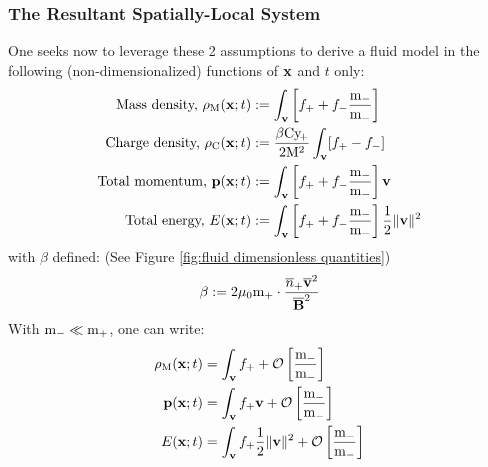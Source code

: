 \subsubsection*{The Resultant Spatially-Local System}
    One seeks now to leverage these 2 assumptions to derive a fluid model in the following (non-dimensionalized) functions of $\mathbf{x}$ and $t$ only:
    \begin{align}
        \text{Mass density, }   \rho_{\mathrm{M}}(\mathbf{x}; t)  &:=  \int_{\mathbf{v}}\left[f_{+} + f_{-}\frac{\mathrm{m}_{-}}{\mathrm{m}_{-}}\right]  \\
        \text{Charge density, } \rho_{\mathrm{C}}(\mathbf{x}; t)  &:=  \frac{\beta\mathrm{Cy}\!_{+}}{2\mathrm{M}^{2}}\int_{\mathbf{v}}[f_{+} - f_{-}]  \\
        \text{Total momentum, }        \mathbf{p}(\mathbf{x}; t)  &:=  \int_{\mathbf{v}}\left[f_{+} + f_{-}\frac{\mathrm{m}_{-}}{\mathrm{m}_{-}}\right]\mathbf{v}  \\
        \text{Total energy, }             E(\mathbf{x}; t)  &:=  \int_{\mathbf{v}}\left[f_{+} + f_{-}\frac{\mathrm{m}_{-}}{\mathrm{m}_{-}}\right]\frac{1}{2}\|\mathbf{v}\|^{2}
    \end{align}
    with $\beta$ defined: (See Figure \ref{fig:fluid dimensionless quantities})
    \begin{equation}
        \beta  :=  2\mu_{0}\mathrm{m}_{+}\cdot\frac{\overline{n}_{+}\overline{\mathbf{v}}^{2}}{\overline{\mathbf{B}}^{2}}
    \end{equation}
    With $\mathrm{m}_{-} \ll \mathrm{m}_{+}$, one can write:
    \begin{align}
      \rho_{\mathrm{M}}(\mathbf{x}; t)  &=  \int_{\mathbf{v}}f_{+} + \mathcal{O}\left[\frac{\mathrm{m}_{-}}{\mathrm{m}_{-}}\right]  \\
             \mathbf{p}(\mathbf{x}; t)  &=  \int_{\mathbf{v}}f_{+}\mathbf{v} + \mathcal{O}\left[\frac{\mathrm{m}_{-}}{\mathrm{m}_{-}}\right]  \\
                E(\mathbf{x}; t)  &=  \int_{\mathbf{v}}f_{+}\frac{1}{2}\|\mathbf{v}\|^{2} + \mathcal{O}\left[\frac{\mathrm{m}_{-}}{\mathrm{m}_{-}}\right]
    \end{align}
    
